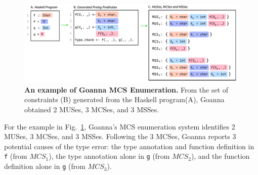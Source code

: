  
     \begin{figure}[htb!]
        \centering
        \includegraphics[width=\linewidth]{images/Enumeration-Example}
        \caption{\textbf{An example of Goanna MCS Enumeration.} From the set of constraints (B) generated from the Haskell program(A), Goanna obtained 2 MUSes, 3 MCSes, and 3 MSSes. }
        \label{fig:enumeration-example}
    \end{figure}
    
   For the example in Fig.~\ref{fig:enumeration-example}, Goanna's MCS enumeration system identifies 2 MUSes, 3 MCSes, and 3 MSSes. Following the 3 MCSes, Goanna reports 3 potential causes of the type error: the type annotation and function definition in \texttt{f} (from $MCS_1$), the type annotation alone in \texttt{g} (from $MCS_2$), and the function definition alone in \texttt{g} (from $MCS_3$). 
   
%
%

